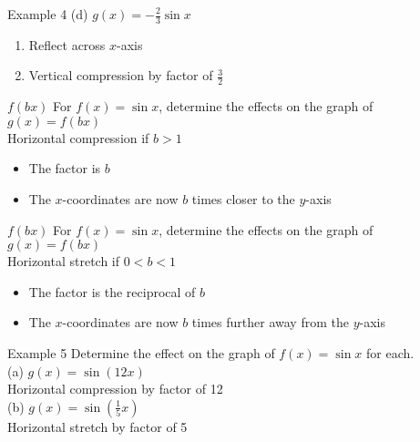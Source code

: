 \documentclass[t,usenames,dvipsnames]{beamer}
\begin{document}
\begin{frame}{Example 4}
(d) \quad $g(x) = -\frac{2}{3}\sin x$ \newline\\ \pause
\begin{enumerate}
    \item Reflect across $x$-axis \newline\\ \pause
    \item Vertical compression by factor of $\frac{3}{2}$
\end{enumerate}
\end{frame}

\begin{frame}{$f(bx)$}
For $f(x) = \sin x$, determine the effects on the graph of $g(x) = f(bx)$   \newline\\  \pause
Horizontal compression if $b > 1$ \newline\\ \pause
\begin{itemize}
    \item The factor is $b$ \newline\\ \pause
    \item The $x$-coordinates are now $b$ times \alert{closer to} the $y$-axis
\end{itemize}
\end{frame}

\begin{frame}{$f(bx)$}
For $f(x) = \sin x$, determine the effects on the graph of $g(x) = f(bx)$   \newline\\  \pause
Horizontal stretch if $0 < b < 1$ \newline\\ \pause
\begin{itemize}
    \item The factor is \alert{the reciprocal of} $b$ \newline\\ \pause
    \item The $x$-coordinates are now $b$ times \alert{further away from} the $y$-axis
\end{itemize}
\end{frame}

\begin{frame}{Example 5}
Determine the effect on the graph of $f(x) = \sin x$ for each. \newline\\ \pause
(a) \quad $g(x) = \sin(12x)$ \newline\\ \pause
Horizontal compression by factor of 12 \newline\\ \pause
(b) \quad $g(x) = \sin \left(\frac{1}{5}x\right)$ \newline\\ \pause
Horizontal stretch by factor of 5
\end{frame}
\end{document}
